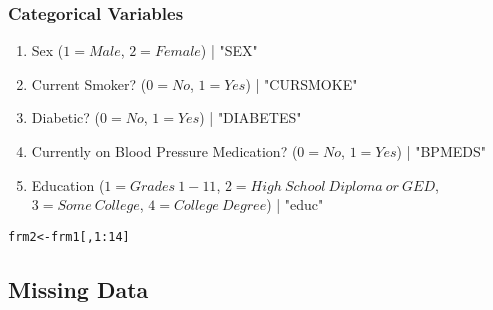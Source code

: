 \documentclass{article}\usepackage[]{graphicx}\usepackage[]{color}
\makeatletter
\newcommand{\hlnum}[1]{\textcolor[rgb]{0.686,0.059,0.569}{#1}}%
\newcommand{\hlopt}[1]{\textcolor[rgb]{0,0,0}{#1}}%
\newcommand{\hlstd}[1]{\textcolor[rgb]{0.345,0.345,0.345}{#1}}%
\newcommand{\hlkwb}[1]{\textcolor[rgb]{0.69,0.353,0.396}{#1}}%
\newenvironment{kframe}{%
 \def\at@end@of@kframe{}%
 \ifinner\ifhmode%
  \def\at@end@of@kframe{\end{minipage}}%
  \begin{minipage}{\columnwidth}%
 \fi\fi%
 \def\FrameCommand##1{\hskip\@totalleftmargin \hskip-\fboxsep
 \colorbox{shadecolor}{##1}\hskip-\fboxsep
     \hskip-\linewidth \hskip-\@totalleftmargin \hskip\columnwidth}%
 \MakeFramed {\advance\hsize-\width
   \@totalleftmargin\z@ \linewidth\hsize
   \@setminipage}}%
 {\par\unskip\endMakeFramed%
 \at@end@of@kframe}
\newenvironment{knitrout}{}{} %
\makeatother
\begin{document}
\subsubsection*{Categorical Variables}

\begin{enumerate}

\item Sex ($1=Male$, $2=Female$) | "SEX"

\item Current Smoker? ($0=No$, $1=Yes$) | "CURSMOKE"

\item Diabetic? ($0=No$, $1=Yes$) | "DIABETES"

\item Currently on Blood Pressure Medication? ($0=No$, $1=Yes$) | "BPMEDS"

\item Education ($1=Grades\:1-11$, $2=High\: School\: Diploma\: or\: GED$, $3=Some\:College$, $4=College\:Degree$) | "educ"

\end{enumerate}

\begin{knitrout}
\color{fgcolor}\begin{kframe}
\begin{alltt}
\hlstd{frm2} \hlkwb{<-} \hlstd{frm1[,} \hlnum{1}\hlopt{:}\hlnum{14}\hlstd{]}
\end{alltt}
\end{kframe}
\end{knitrout}


\subsection{Missing Data}
\end{document}
